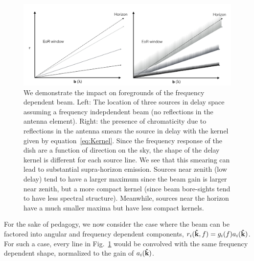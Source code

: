 \documentclass[onecolumn]{emulateapj}
\begin{document}
\begin{figure}[h!]
\includegraphics[width=\textwidth]{figures/wedgeCompare.pdf}
\caption{We demonstrate the impact on foregrounds of the frequency dependent beam. Left: The location of three sources in delay space assuming a frequency indepdendent beam (no reflections in the antenna element). Right: the presence of chromaticity due to reflections in the antenna smears the source in delay with the kernel given by equation~\ref{eq:Kernel}. Since the frequency response of the dish are a function of direction on the sky, the shape of the delay kernel is different for each source line. We see that this smearing can lead to substantial supra-horizon emission. Sources near zenith (low delay) tend to have a larger maximum since the beam gain is larger near zenith, but a more compact kernel (since beam bore-sights tend to have less spectral structure). Meanwhile, sources near the horizon have a much smaller maxima but have less compact kernels.}
\label{fig:Smearing}
\end{figure}
For the sake of pedagogy, we now consider the case where the beam can be factored into angular and frequency dependent components, $r_i({\bf \hat{k}},f) = g_i(f)a_i({\bf \hat{k}})$. For such a case, every line in Fig.~\ref{fig:Smearing} would be convolved with the same frequency dependent shape, normalized to the gain of $a_i({\bf \hat{k}})$. 
\end{document}
